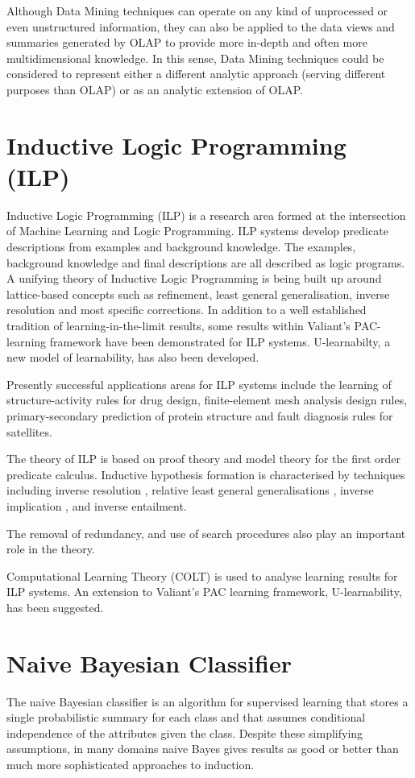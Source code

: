 \documentclass[11pt]{article} %
\begin{document}
Although Data Mining techniques can operate on any kind of unprocessed or even unstructured information, they can also be applied to the data views and summaries generated by OLAP to provide more in-depth and often more multidimensional knowledge. In this sense, Data Mining techniques could be considered to represent either a different analytic approach (serving different purposes than OLAP) or as an analytic extension of OLAP.






\section{Inductive Logic Programming (ILP)}

Inductive Logic Programming (ILP) is a research area formed at the intersection of Machine Learning and Logic Programming. ILP systems develop predicate descriptions from examples and background knowledge. The examples, background knowledge and final descriptions are all described as logic programs. A unifying theory of Inductive Logic Programming is being built up around lattice-based concepts such as refinement, least general generalisation, inverse resolution and most specific corrections. In addition to a well established tradition of learning-in-the-limit results, some results within Valiant's PAC-learning framework have been demonstrated for ILP systems. U-learnabilty, a new model of learnability, has also been developed.


Presently successful applications areas for ILP systems include the learning of structure-activity rules for drug design, finite-element mesh analysis design rules, primary-secondary prediction of protein structure and fault diagnosis rules for satellites.


The theory of ILP is based on proof theory and model theory for the first order predicate calculus. Inductive hypothesis formation is characterised by techniques including inverse resolution , relative least general generalisations , inverse implication , and inverse entailment.


The removal of redundancy, and use of search procedures also play an important role in the theory.


Computational Learning Theory (COLT) is used to analyse learning results for ILP systems. An extension to Valiant's PAC learning framework, U-learnability, has been suggested.



\section{Naive Bayesian Classifier}

The naive Bayesian classifier is an algorithm for supervised learning that stores a single probabilistic summary for each class and that assumes conditional independence of the attributes given the class. Despite these simplifying assumptions, in many domains naive Bayes gives results as good or better than much more sophisticated approaches to induction. 
\end{document}
